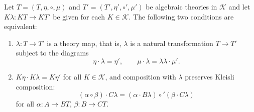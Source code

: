 Let $T = (T, \eta, \circ, \mu)$ and $T' = (T', \eta', \circ', \mu')$ be algebraic theories in $\mathcal{K}$ and let $K\lambda: KT \longrightarrow KT'$ be given for each $K \in \mathcal{K}$. The following two conditions are equivalent:

\begin{enumerate}
\item $\lambda: T \longrightarrow T'$ is a theory map, that is, $\lambda$ is a natural transformation $T \longrightarrow T'$ subject to the diagrams
$$
\eta \cdot \lambda = \eta', \qquad \mu \cdot \lambda = \lambda\lambda \cdot \mu'.
$$

\item $K\eta \cdot K\lambda = K\eta'$ for all $K \in \mathcal{K}$, and composition with $\lambda$ preserves Kleisli composition:
$$
(\alpha \circ \beta) \cdot C\lambda = (\alpha \cdot B\lambda) \circ' (\beta \cdot C\lambda)
$$
for all $\alpha: A \longrightarrow BT$, $\beta: B \longrightarrow CT$.
\end{enumerate}
